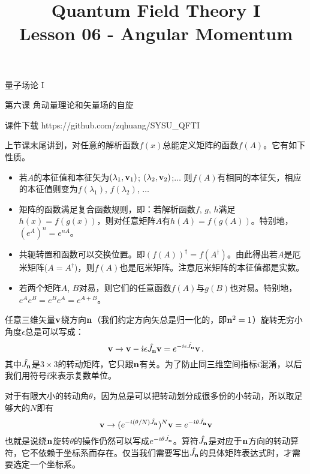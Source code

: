 \documentclass[CJK]{beamer}
\title{Quantum Field Theory I \\ Lesson 06 - Angular Momentum}
\author{}
\date{}
\begin{document}
\begin{frame}
 
\begin{center}
\begin{Large}
\bch
量子场论 I 

{\vskip 0.3in}

第六课 角动量理论和矢量场的自旋

\ech
\end{Large}
\end{center}

\vskip 0.2in

\bch
课件下载
\ech
https://github.com/zqhuang/SYSU\_QFTI

\end{frame}



\begin{frame}
\bch
上节课末尾讲到，对任意的解析函数$f(x)$总能定义矩阵的函数$f(A)$。它有如下性质。
\begin{itemize}
\item{若$A$的本征值和本征矢为$(\lambda_1, {\mathbf{v}}_1)$; $(\lambda_2, {\mathbf{v}}_2)$;$\ldots$ 则$f(A)$有相同的本征矢，相应的本征值则变为$f(\lambda_1)$, $f(\lambda_2)$, $\ldots$}
\item{矩阵的函数满足复合函数规则，即：若解析函数$f$, $g$, $h$满足$h(x) = f(g(x))$，则对任意矩阵$A$有$h(A)=f(g(A))$。特别地，$(e^A)^n = e^{nA}$。}
\item{共轭转置和函数可以交换位置。即$\left(f(A)\right)^\dagger = f(A^\dagger)$。由此得出若$A$是厄米矩阵($A=A^\dagger$)，则$f(A)$也是厄米矩阵。注意厄米矩阵的本征值都是实数。}
\item{若两个矩阵$A$, $B$对易，则它们的任意函数$f(A)$与$g(B)$也对易。特别地，$ e^{A}e^{B} = e^{B}e^{A}=e^{A+B}$。}
\end{itemize}

\ech
\end{frame}

\begin{frame}
\bch
任意三维矢量${\mathbf{v}}$绕方向${\mathbf{n}}$（我们约定方向矢总是归一化的，即${\mathbf{n}}^2=1$）旋转无穷小角度$\epsilon$总是可以写成：
$${\mathbf{v}} \rightarrow {\mathbf{v}} - {\dot{\imath}}\epsilon {\hat{J_{\mathbf{n}}}} {\mathbf{v}} = e^{-{\dot{\imath}}\epsilon{\hat{J_{\mathbf{n}}}}}{\mathbf{v}}\,.$$
其中${\hat{J_{\mathbf{n}}}}$是$3\times 3$的转动矩阵，它只跟${\mathbf{n}}$有关。为了防止同三维空间指标$i$混淆，以后我们用符号$\ii$来表示复数单位。

对于有限大小的转动角$\theta$，因为总是可以把转动划分成很多份的小转动，所以取足够大的$N$即有
$${\mathbf{v}}\rightarrow (e^{-{\dot{\imath}}(\theta/N){\hat{J_{\mathbf{n}}}}})^N{\mathbf{v}} = e^{-{\dot{\imath}}\theta {\hat{J_{\mathbf{n}}}}}{\mathbf{v}}$$
也就是说绕${\mathbf{n}}$旋转$\theta$的操作仍然可以写成$e^{-{\dot{\imath}}\theta {\hat{J_{\mathbf{n}}}}}$。算符${\hat{J_{\mathbf{n}}}}$是对应于${\mathbf{n}}$方向的转动算符，它不依赖于坐标系而存在。仅当我们需要写出${\hat{J_{\mathbf{n}}}}$的具体矩阵表达式时，才需要选定一个坐标系。

\ech
\end{frame}
\end{document}
